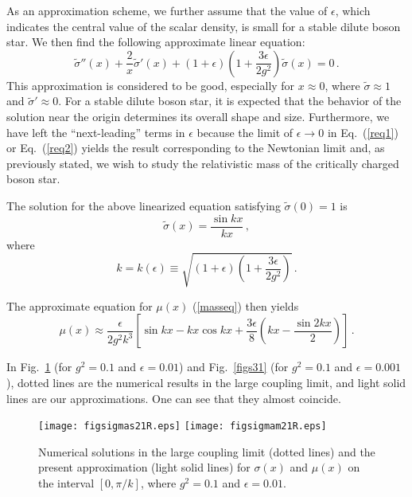 \documentclass[
aps,prd,
12pt,%
nopreprintnumbers,
showpacs,
eqsecnum,
nofootinbib
]{revtex4-1}
\begin{document}
As an approximation scheme, we further assume that the value of $\epsilon$, which
indicates the central value of the scalar density, is small for a stable dilute
boson star. We then find the following approximate linear equation:
\begin{equation}
\tilde{\sigma}''(x)+\frac{2}{x}\tilde{\sigma}'(x)+(1+\epsilon)
\left(1+\frac{3\epsilon}{2g^2}\right)\tilde{\sigma}(x)=0\,.
\label{req2}
\end{equation}
This approximation is considered to be good, especially for $x\approx 0$, where
$\tilde{\sigma}\approx 1$ and $\tilde{\sigma}'\approx 0$. 
For a stable dilute boson star, it is expected that the behavior of the solution
near the origin determines its overall shape and size.
Furthermore, we have left the ``next-leading'' terms in $\epsilon$ because
the limit of $\epsilon\rightarrow 0$ in Eq.~(\ref{req1}) or Eq.~(\ref{req2})
yields the result corresponding to the Newtonian limit and,
as previously stated, we wish to study the relativistic mass of the
critically charged boson star. 

The solution for the above linearized equation satisfying $\tilde{\sigma}(0)=1$ is
\begin{equation}
\tilde{\sigma}(x)=\frac{\sin kx}{kx}\,,
\label{sinek}
\end{equation}
where
\begin{equation}
k=k(\epsilon)\equiv\sqrt{(1+\epsilon)
\left(1+\frac{3\epsilon}{2g^2}\right)}\,.
\end{equation}

The approximate equation for $\mu(x)$ (\ref{masseq}) then yields
\begin{equation}
\mu(x)\approx\frac{\epsilon}{2g^2k^3}\left[\sin kx- kx\cos
kx+\frac{3\epsilon}{8}\left(kx-\frac{\sin 2kx}{2}\right)\right]\,.
\end{equation}

In Fig.~\ref{figs21} (for $g^2=0.1$ and
$\epsilon=0.01$) and Fig.~\ref{figs31} (for $g^2=0.1$ and
$\epsilon=0.001$), dotted lines are the numerical results in the large coupling
limit, and light solid lines are our approximations.
One can see that they almost coincide.

\begin{figure}[ht]
\centering
\texttt{[image: figsigmas21R.eps]}
\texttt{[image: figsigmam21R.eps]}
\caption{
Numerical solutions in the large coupling limit (dotted lines) and the
present approximation (light solid lines) for $\sigma(x)$ and $\mu(x)$ on the
interval $[0,
\pi/k]$, where
$g^2=0.1$ and
$\epsilon=0.01$.}
\label{figs21}
\end{figure}
\end{document}
